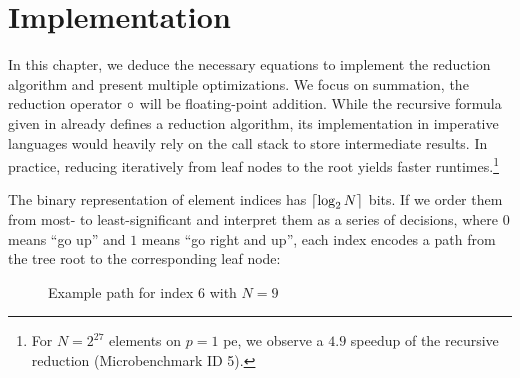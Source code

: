 \chapter{Implementation}
\label{ch:Implementation}

In this chapter, we deduce the necessary equations to implement the reduction algorithm and present multiple optimizations.
We focus on summation, the reduction operator $\operatorname{\circ}$ will be floating-point addition.
While the recursive formula given in  already defines a reduction algorithm, its implementation in imperative languages would heavily rely on the call stack to store intermediate results.
In practice, reducing iteratively from leaf nodes to the root yields faster runtimes.\footnote{For $N=2^{27}$ elements on $p=1$ \gls{pe}, we observe a $4.9$ speedup of the recursive reduction (Microbenchmark ID 5).}

The binary representation of element indices has $\lceil \log_2 N \rceil$ bits.
If we order them from most- to least-significant and interpret them as a series of decisions, where $0$ means \enquote{go up} and $1$ means \enquote{go right and up}, each index encodes a path from the tree root to the corresponding leaf node:

\begin{figure}[H]
\centering
{}
\caption{Example path for index $6$ with $N = 9$}
\label{fig:indexTreePath}
\end{figure}

